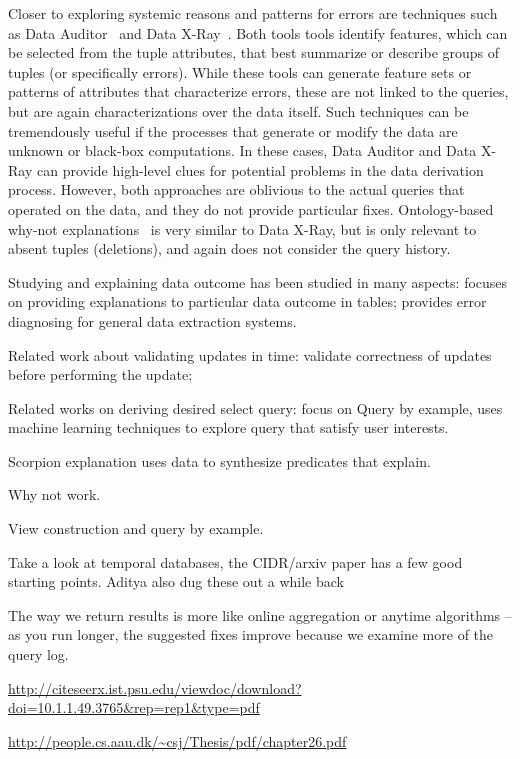 Closer to exploring systemic reasons and patterns for errors are
techniques such as Data Auditor~\cite{Golab2008, GolabKKS10} and Data
X-Ray~\cite{wang2015}. Both tools tools identify features, which can
be selected from the tuple attributes, that best summarize or describe
groups of tuples (or specifically errors). While these tools can
generate feature sets or patterns of attributes that characterize
errors, these are not linked to the queries, but are again
characterizations over the data itself. Such techniques can be
tremendously useful if the processes that generate or modify the data
are unknown or black-box computations. In these cases, Data Auditor
and Data X-Ray can provide high-level clues for potential problems in
the data derivation process. However, both approaches are oblivious to
the actual queries that operated on the data, and they do not provide
particular fixes. Ontology-based why-not
explanations~\cite{tenCate2015} is very similar to Data X-Ray, but is
only relevant to absent tuples (deletions), and again does not
consider the query history.





Studying and explaining
data outcome has been studied in many aspects:
\cite{GebalyAGKS14}
focuses on providing 
explanations to particular data outcome in tables; \cite{wang2015}
provides error diagnosing for general data extraction systems. 


Related work about validating updates in time: 
\cite{Chen2011} validate correctness of updates before performing the update;


Related works on deriving desired select query: focus on 
Query by example, \cite{dimitriadou2014explore}  uses machine learning
techniques to explore query that satisfy user interests. 


\cite{mucslu2013data}



Scorpion explanation uses data to synthesize predicates that explain.

Why not work.

View construction and query by example.

Take a look at temporal databases, the CIDR/arxiv paper has a few good starting points. Aditya also dug these out a while back


The way we return results is more like online aggregation or anytime algorithms -- 
as you run longer, the suggested fixes improve because we examine more of the query log.

\url{http://citeseerx.ist.psu.edu/viewdoc/download?doi=10.1.1.49.3765&rep=rep1&type=pdf}

\url{http://people.cs.aau.dk/~csj/Thesis/pdf/chapter26.pdf}
